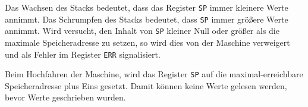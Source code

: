 Das Wachsen des Stacks bedeutet, dass das Register
\texttt{SP} immer kleinere Werte annimmt. Das Schrumpfen
des Stacks bedeutet, dass \texttt{SP} immer größere Werte annimmt. Wird
versucht, den Inhalt von \texttt{SP} kleiner Null oder größer als die maximale
Speicheradresse zu setzen, so wird dies von der Maschine verweigert und als
Fehler im Register \texttt{ERR} signalisiert.

Beim Hochfahren der Maschine, wird das Register \texttt{SP} auf die
maximal-erreichbare Speicheradresse plus Eins gesetzt. Damit können keine Werte
gelesen werden, bevor Werte geschrieben wurden.


